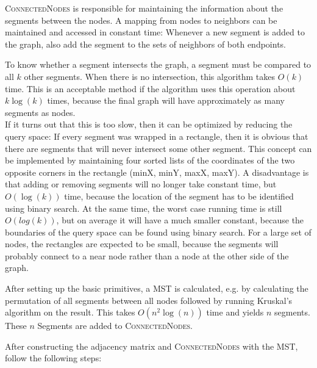 \documentclass[11pt]{article}
\begin{document}
\textsc{ConnectedNodes} is responsible for maintaining the information about the segments between the nodes. A mapping from nodes to neighbors can be maintained and accessed in constant time: Whenever a new segment is added to the graph, also add the segment to the sets of neighbors of both endpoints.

To know whether a segment intersects the graph, a segment must be compared to all $k$ other segments. When there is no intersection, this algorithm takes $O(k)$ time. This is an acceptable method if the algorithm uses this operation about $k \log(k)$ times, because the final graph will have approximately as many segments as nodes.\\
If it turns out that this is too slow, then it can be optimized by reducing the query space: If every segment was wrapped in a rectangle, then it is obvious that there are segments that will never intersect some other segment. This concept can be implemented by maintaining four sorted lists of the coordinates of the two opposite corners in the rectangle (minX, minY, maxX, maxY). A disadvantage is that adding or removing segments will no longer take constant time, but $O(\log(k))$ time, because the location of the segment has to be identified using binary search. At the same time, the worst case running time is still $O(log(k))$, but on average it will have a much smaller constant, because the boundaries of the query space can be found using binary search. For a large set of nodes, the rectangles are expected to be small, because the segments will probably connect to a near node rather than a node at the other side of the graph.

After setting up the basic primitives, a MST is calculated, e.g. by calculating the permutation of all segments between all nodes followed by running Kruskal's algorithm \cite{kruskal} on the result. This takes $O(n^2\log(n))$ time and yields $n$ segments. These $n$ Segments are added to \textsc{ConnectedNodes}.

After constructing the adjacency matrix and \textsc{ConnectedNodes} with the MST, follow the following steps:
\end{document}
